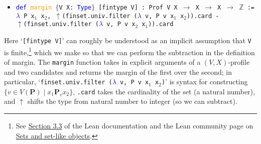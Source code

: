 \documentclass[runningheads]{llncs}
\begin{document}
\begin{itemize}
\item[] \texttt{\textcolor{blue}{def} \textcolor{orange}{margin} $\{$V X: \textcolor{blue}{Type}$\}$  [fintype V] : Prof V X $\to$ X $\to$ X $\to$ $\mathbb{Z}$ := } \texttt{
    \textcolor{blue}{$\lambda$} P x$_1$ x$_2$, $\uparrow$(finset.univ.filter (\textcolor{blue}{$\lambda$} v, P v x$_1$ x$_2$)).card
        -} \\ \texttt{$\uparrow$(finset.univ.filter (\textcolor{blue}{$\lambda$} v, P v x$_2$ x$_1$)).card}
\end{itemize}
Here `\texttt{[fintype V]}' can roughly be understood as an implicit assumption that \texttt{V} is finite,\footnote{See \href{https://leanprover.github.io/reference/expressions.html\#implicit-arguments}{Section 3.3} of the Lean documentation and the Lean community page on \href{https://leanprover-community.github.io/theories/sets.html\#finite-types}{Sets and set-like objects}.} which we make so that we can perform the subtraction in the definition of margin. The \texttt{margin} function takes in explicit arguments of a $(V,X)$-profile and two candidates  and returns the margin of the first over the second; in particular, `\texttt{finset.univ.filter (\textcolor{blue}{$\lambda$} v, P v x$_1$ x$_2$)}' is syntax for constructing $\{v\in V(\mathbf{P})\mid x_1\mathbf{P}_v x_2\}$, \texttt{.card} takes the cardinality of the set (a natural number), and $\uparrow$ shifts the type from natural number to integer (so we can subtract).

\begin{comment}
In a profile $\mathbf{P}$, we say that $x$ is \textit{majority preferred} to $y$ if the margin of $x$ over $y$ is positive, formalized as follows:
\begin{itemize}
\item[] \texttt{\textcolor{blue}{def} \textcolor{orange}{margin\_pos} [fintype V] : Profile V X $\to$ X $\to$ X $\to$ \textcolor{blue}{Prop} :=}
\\ \texttt{\textcolor{blue}{$\lambda$} P x y, 0 < (margin P) x y}
\end{itemize}
So \texttt{margin\_pos} is a function that takes in a $(V,X)$-profile and two candidates and returns the proposition that the first is majority preferred to the second.
\end{comment}
\end{document}

